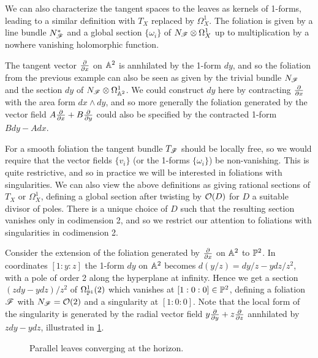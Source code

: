 We can also characterize the tangent spaces to the leaves as kernels of 1-forms,
leading to a similar definition with $T_X$ replaced by $\Omega^1_X$. The
foliation is given by a line bundle $N_\scrF^*$ and a global section
$\{\omega_i\}$ of $N_\scrF\otimes\Omega^1_X$ up to multiplication by a nowhere
vanishing holomorphic function.

\begin{example}
    The tangent vector $\pdv{}{x}$ on $\A^2$ is annhilated by the 1-form $dy$,
    and so the foliation from the previous example can also be seen as given by
    the trivial bundle $N_\scrF$ and the section $dy$ of
    $N_\scrF\otimes\Omega^1_{\A^2}$. We could construct $dy$ here by contracting
    $\pdv{}{x}$ with the area form $dx\wedge dy$, and so more generally the
    foliation generated by the vector field $A\pdv{}{x}+B\pdv{}{y}$ could also
    be specified by the contracted 1-form $Bdy-Adx$.
\end{example}

For a smooth foliation the tangent bundle $T_\scrF$ should be locally free, so
we would require that the vector fields $\{v_i\}$ (or the 1-forms
$\{\omega_i\}$) be non-vanishing. This is quite restrictive, and so in practice
we will be interested in foliations with singularities. We can also view the
above definitions as giving rational sections of $T_X$ or $\Omega^1_X$, defining
a global section after twisting by $\O(D)$ for $D$ a suitable divisor of poles.
There is a unique choice of $D$ such that the resulting section vanishes only in
codimension 2, and so we restrict our attention to foliations with singularities
in codimension 2.

\begin{example}
    Consider the extension of the foliation generated by $\pdv{}{x}$ on $\A^2$
    to $\P^2$. In coordinates $[1:y:z]$ the 1-form $dy$ on $\A^2$ becomes
    $d(y/z)=dy/z-ydz/z^2$, with a pole of order 2 along the hyperplane at
    infinity. Hence we get a section $(zdy-ydz)/z^2$ of $\Omega^1_{\P^1}(2)$
    which vanishes at $[1:0:0]\in\P^2$, defining a foliation $\scrF$ with
    $N_\scrF=\O(2)$ and a singularity at $[1:0:0]$. Note that the local form of
    the singularity is generated by the radial vector field
    $y\pdv{}{y}+z\pdv{}{z}$ annhilated by $zdy-ydz$, illustrated in
    \cref{fig:parallel}.
    \begin{figure}[H]
        \centering
        \caption{Parallel leaves converging at the horizon.}
        \label{fig:parallel}
    \end{figure}
\end{example}

